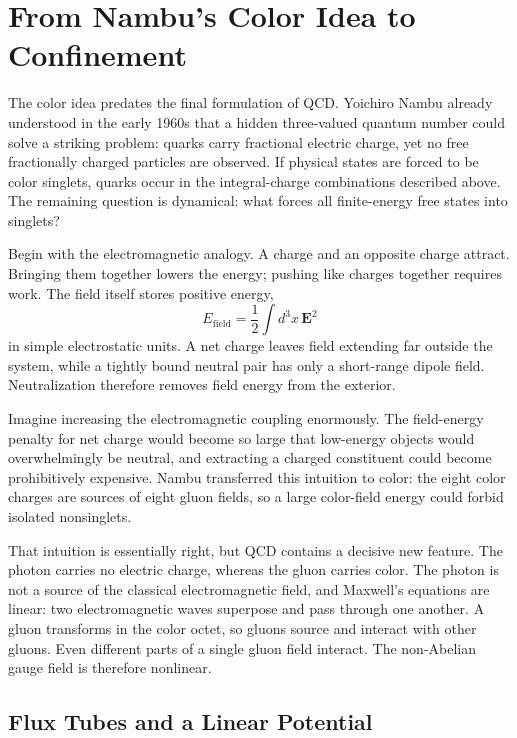 \section{From Nambu's Color Idea to Confinement}

The color idea predates the final formulation of QCD. Yoichiro Nambu already
understood in the early 1960s that a hidden three-valued quantum number could
solve a striking problem: quarks carry fractional electric charge, yet no free
fractionally charged particles are observed. If physical states are forced to
be color singlets, quarks occur in the integral-charge combinations described
above. The remaining question is dynamical: what forces all finite-energy free
states into singlets?

Begin with the electromagnetic analogy. A charge and an opposite charge
attract. Bringing them together lowers the energy; pushing like charges
together requires work. The field itself stores positive energy,
\begin{equation}
E_{\mathrm{field}}
=\frac12\int d^3x\,\boldsymbol E^2
\end{equation}
in simple electrostatic units. A net charge leaves field extending far outside
the system, while a tightly bound neutral pair has only a short-range dipole
field. Neutralization therefore removes field energy from the exterior.

Imagine increasing the electromagnetic coupling enormously. The field-energy
penalty for net charge would become so large that low-energy objects would
overwhelmingly be neutral, and extracting a charged constituent could become
prohibitively expensive. Nambu transferred this intuition to color: the eight
color charges are sources of eight gluon fields, so a large color-field energy
could forbid isolated nonsinglets.

That intuition is essentially right, but QCD contains a decisive new feature.
The photon carries no electric charge, whereas the gluon carries color. The
photon is not a source of the classical electromagnetic field, and Maxwell's
equations are linear: two electromagnetic waves superpose and pass through
one another. A gluon transforms in the color octet, so gluons source and
interact with other gluons. Even different parts of a single gluon field
interact. The non-Abelian gauge field is therefore nonlinear.

\subsection{Flux Tubes and a Linear Potential}


